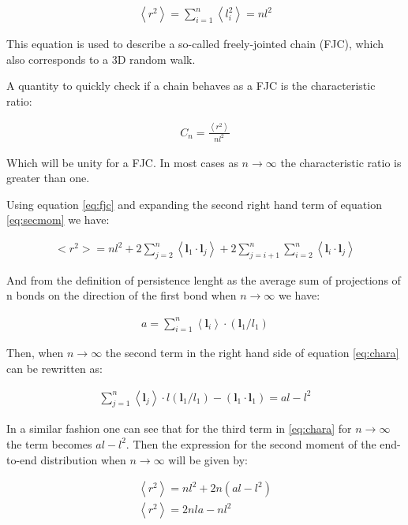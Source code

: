 \begin{gather}
\label{eq:fjc}  
\left<r^2 \right> = \sum_{i=1}^{n}\left<l_{i}^2\right> = nl^2
\end{gather}  

This equation is used to describe a so-called freely-jointed chain
(FJC), which also corresponds to a 3D random walk.

A quantity to quickly check if a chain behaves as a FJC is the
characteristic ratio:

\begin{gather}
C_{n}=\frac{\left<r^{2}\right>}{nl^{2}}
\end{gather}

Which will be unity for a FJC. In most cases as $n \to \infty$ the
characteristic ratio is greater than one.

Using equation \ref{eq:fjc} and expanding the second right
hand term of equation \ref{eq:secmom} we have:

\begin{gather}
\label{eq:char}  
<r^{2}> = nl^{2} + 2 \sum_{j=2}^{n}
\left<  \mathbf{l}_{1} \cdot \mathbf{l}_{j}\right> +
2 \sum_{j=i+1}^{n}\sum_{i=2}^{n}
\left<  \mathbf{l}_{i} \cdot \mathbf{l}_{j}\right>
\end{gather}

And from the definition of persistence lenght as the average sum of
projections of n bonds on the direction of the first bond when $n \to
\infty$ we have:

\begin{gather}
a = \sum_{i=1}^{n} \left<\mathbf{l}_{i}\right> \cdot (\mathbf{l}_{1}/l_{1})
\end{gather}
  
Then, when $n \to \infty$ the second term in the right hand side of
equation \ref{eq:chara} can be rewritten as:

\begin{gather}
\sum_{j=1}^{n} \left<\mathbf{l}_{j}\right> \cdot l(\mathbf{l}_{1}/l_{1}) -(\mathbf{l}_{1}
\cdot \mathbf{l}_{1}) = al - l^{2}
\end{gather}  

In a similar fashion one can see that for the third term in
\ref{eq:chara} for $n \to \infty$ the term becomes $al-l^{2}$.
Then the expression for the second moment of the end-to-end
distribution when $n \to \infty$ will be given by:

\begin{gather}
\left<r^{2}\right> = nl^{2} + 2n(al-l^{2})\\
\left<r^{2}\right> = 2nla - nl^{2}
\end{gather}  

